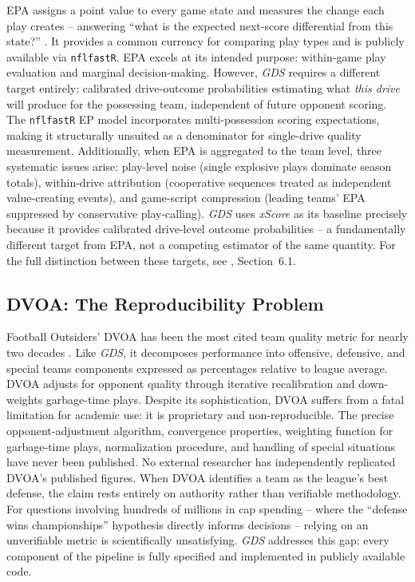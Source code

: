 \documentclass[12pt,a4paper]{article}
\newcommand{\xscore}{\textit{xScore}}
\newcommand{\gds}{\textit{GDS}}
\begin{document}
EPA assigns a point value to every game state and measures the change each play creates -- answering ``what is the expected next-score differential from this state?'' \citep{carter1971operations, carl2021nflfastr}. It provides a common currency for comparing play types and is publicly available via \texttt{nflfastR}. EPA excels at its intended purpose: within-game play evaluation and marginal decision-making. However, \gds{} requires a different target entirely: calibrated drive-outcome probabilities estimating what \emph{this drive} will produce for the possessing team, independent of future opponent scoring. The \texttt{nflfastR} EP model incorporates multi-possession scoring expectations, making it structurally unsuited as a denominator for single-drive quality measurement. Additionally, when EPA is aggregated to the team level, three systematic issues arise: play-level noise (single explosive plays dominate season totals), within-drive attribution (cooperative sequences treated as independent value-creating events), and game-script compression (leading teams' EPA suppressed by conservative play-calling). \gds{} uses \xscore{} \citep{mecha2026xscore-model} as its baseline precisely because it provides calibrated drive-level outcome probabilities -- a fundamentally different target from EPA, not a competing estimator of the same quantity. For the full distinction between these targets, see \citet{mecha2026xscore-model}, Section~6.1.

\subsection{DVOA: The Reproducibility Problem}

Football Outsiders' DVOA has been the most cited team quality metric for nearly two decades \citep{schatz2005dvoa}. Like \gds{}, it decomposes performance into offensive, defensive, and special teams components expressed as percentages relative to league average. DVOA adjusts for opponent quality through iterative recalibration and down-weights garbage-time plays. Despite its sophistication, DVOA suffers from a fatal limitation for academic use: it is proprietary and non-reproducible. The precise opponent-adjustment algorithm, convergence properties, weighting function for garbage-time plays, normalization procedure, and handling of special situations have never been published. No external researcher has independently replicated DVOA's published figures. When DVOA identifies a team as the league's best defense, the claim rests entirely on authority rather than verifiable methodology. For questions involving hundreds of millions in cap spending -- where the ``defense wins championships'' hypothesis directly informs decisions -- relying on an unverifiable metric is scientifically unsatisfying. \gds{} addresses this gap: every component of the pipeline is fully specified and implemented in publicly available code.
\end{document}
